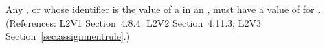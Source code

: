 Any \Compartment, \Species or \Parameter whose identifier is the value of a
  in an \AssignmentRule, must have a value of
 for .  (References: L2V1 Section~4.8.4; L2V2
Section~4.11.3; L2V3 Section~\ref{sec:assignmentrule}.)
